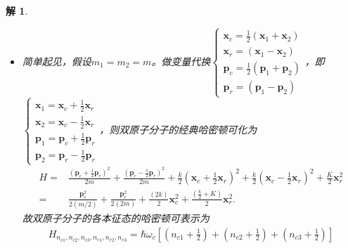\documentclass[UTF8,10pt,a4paper]{article}
\theoremstyle{Problem}
\theoremstyle{Solution}
\newtheorem*{sol}{解}
\begin{document}
\begin{sol}
\begin{itemize}
              \begin{equation}
                  Z=\frac{1}{\beta^6}\left[\frac{m_1m_2}{k\left(k+2K\right)}\right]^{3/2}.
              \end{equation}
              单个双原子分子的平均能量为
              \begin{equation}
                  \langle E\rangle=-\frac{\partial}{\partial\beta}\ln Z=\frac{6}{\beta}=6k_BT.
              \end{equation}
              单个双原子分子的热容为
              \begin{equation}
                  C=\frac{\partial\langle E\rangle}{\partial T}=6k_B.
              \end{equation}
              也就是说单个原子的平均热容为$3k_B$.
        \item[(b)] 简单起见，假设$m_1=m_2=m$。做变量代换$\left\{\begin{array}{l}\bm{x}_c=\frac{1}{2}(\bm{x}_1+\bm{x}_2)\\\bm{x}_r=(\bm{x}_1-\bm{x}_2)\\\bm{p}_c=\frac{1}{2}(\bm{p}_1+\bm{p}_2)\\\bm{p}_r=(\bm{p}_1-\bm{p}_2)\end{array}\right.$，即$\left\{\begin{array}{l}\bm{x}_1=\bm{x}_c+\frac{1}{2}\bm{x}_r\\\bm{x}_2=\bm{x}_c-\frac{1}{2}\bm{x}_r\\\bm{p}_1=\bm{p}_c+\frac{1}{2}\bm{p}_r\\\bm{p}_2=\bm{p}_r-\frac{1}{2}\bm{p}_r\end{array}\right.$，则双原子分子的经典哈密顿可化为
              \begin{align}
                  \nonumber H= & \frac{\left(\bm{p}_c+\frac{1}{2}\bm{p}_r\right)^2}{2m}+\frac{\left(\bm{p}_c-\frac{1}{2}\bm{p}_r\right)^2}{2m}+\frac{k}{2}\left(\bm{x}_c+\frac{1}{2}\bm{x}_r\right)^2+\frac{k}{2}\left(\bm{x}_c-\frac{1}{2}\bm{x}_r\right)^2+\frac{K}{2}\bm{x}_r^2 \\
                  =            & \frac{\bm{p}_c^2}{2(m/2)}+\frac{\bm{p}_r^2}{2(2m)}+\frac{(2k)}{2}\bm{x}_c^2+\frac{\left(\frac{k}{2}+K\right)}{2}\bm{x}_r^2.
              \end{align}
              故双原子分子的各本征态的哈密顿可表示为
              \begin{multline}
                  H_{n_{c1},n_{c2},n_{c3},n_{r1},n_{r2},n_{r3}}=\hbar\omega_c\left[\left(n_{c1}+\frac{1}{2}\right)+\left(n_{c2}+\frac{1}{2}\right)+\left(n_{c3}+\frac{1}{2}\right)\right]\\

\end{multline}
\end{itemize}
\end{sol}
\end{document}
